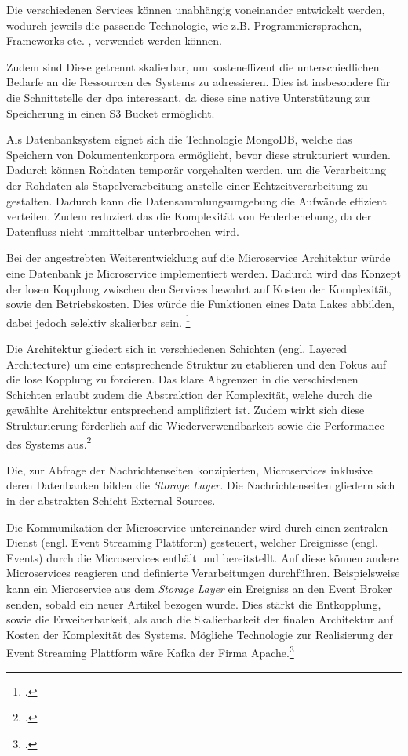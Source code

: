Die verschiedenen Services können unabhängig voneinander entwickelt werden, wodurch jeweils die passende Technologie, wie z.B. Programmiersprachen, Frameworks etc. , verwendet werden können. 

Zudem sind Diese getrennt skalierbar, um kosteneffizent die unterschiedlichen Bedarfe an die Ressourcen des Systems zu adressieren. Dies ist insbesondere für die Schnittstelle der dpa interessant, da diese eine native Unterstützung zur Speicherung in einen S3 Bucket ermöglicht. 

Als Datenbanksystem eignet sich die Technologie MongoDB, welche das Speichern von Dokumentenkorpora ermöglicht, bevor diese strukturiert wurden. Dadurch können Rohdaten temporär vorgehalten werden, um die Verarbeitung der Rohdaten als Stapelverarbeitung anstelle einer Echtzeitverarbeitung zu gestalten. Dadurch kann die Datensammlungsumgebung die Aufwände effizient verteilen. 
Zudem reduziert das die Komplexität von Fehlerbehebung, da der Datenfluss nicht unmittelbar unterbrochen wird.

Bei der angestrebten Weiterentwicklung auf die Microservice Architektur würde eine Datenbank je Microservice implementiert werden. Dadurch wird das Konzept der losen Kopplung zwischen den Services bewahrt auf Kosten der Komplexität, sowie den Betriebskosten. Dies würde die Funktionen eines Data Lakes abbilden, dabei jedoch selektiv skalierbar sein. \footcite[Vgl.][]{Iatropoulou.BigDataServices.2021}{}{}

Die Architektur gliedert sich in verschiedenen Schichten (engl. Layered Architecture) um eine entsprechende Struktur zu etablieren und den Fokus auf die lose Kopplung zu forcieren. Das klare Abgrenzen in die verschiedenen Schichten erlaubt zudem die Abstraktion der Komplexität, welche durch die gewählte Architektur entsprechend amplifiziert ist. Zudem wirkt sich diese Strukturierung förderlich auf die Wiederverwendbarkeit sowie die Performance des Systems aus.\footcite[Vgl.][]{Wang.LayeredMicroservices.2018}{}{}

Die, zur Abfrage der Nachrichtenseiten konzipierten, Microservices inklusive deren Datenbanken bilden die \textit{Storage Layer.} Die Nachrichtenseiten gliedern sich in der abstrakten Schicht External Sources.

Die Kommunikation der Microservice untereinander wird durch einen zentralen Dienst (engl. Event Streaming Plattform) gesteuert, welcher Ereignisse (engl. Events) durch die Microservices enthält und bereitstellt. Auf diese können andere Microservices reagieren und definierte Verarbeitungen durchführen. Beispielsweise kann ein Microservice aus dem \textit{Storage Layer} ein Ereigniss an den Event Broker senden, sobald ein neuer Artikel bezogen wurde. Dies stärkt die Entkopplung, sowie die Erweiterbarkeit, als auch die Skalierbarkeit der finalen Architektur auf Kosten der Komplexität des Systems.
Mögliche Technologie zur Realisierung der Event Streaming Plattform wäre Kafka der Firma Apache.\footcite[Vgl.][]{Kul.PublishSubscribeMicroservices.2021}{}{}

